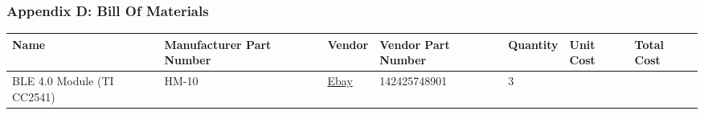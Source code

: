 \documentclass[]{article}
\begin{document}
\hypertarget{appendix-d-bill-of-materials}{%
\subsubsection{Appendix D: Bill Of
Materials}\label{appendix-d-bill-of-materials}}

\begin{longtable}[]{@{}lllllll@{}}
\toprule
\begin{minipage}[b]{0.15\columnwidth}\raggedright
Name\strut
\end{minipage} & \begin{minipage}[b]{0.15\columnwidth}\raggedright
Manufacturer Part Number\strut
\end{minipage} & \begin{minipage}[b]{0.10\columnwidth}\raggedright
Vendor\strut
\end{minipage} & \begin{minipage}[b]{0.17\columnwidth}\raggedright
Vendor Part Number\strut
\end{minipage} & \begin{minipage}[b]{0.11\columnwidth}\raggedright
Quantity\strut
\end{minipage} & \begin{minipage}[b]{0.06\columnwidth}\raggedright
Unit Cost\strut
\end{minipage} & \begin{minipage}[b]{0.07\columnwidth}\raggedright
Total Cost\strut
\end{minipage}\tabularnewline
\midrule
\endhead
\begin{minipage}[t]{0.15\columnwidth}\raggedright
BLE 4.0 Module (TI CC2541)\strut
\end{minipage} & \begin{minipage}[t]{0.15\columnwidth}\raggedright
HM-10\strut
\end{minipage} & \begin{minipage}[t]{0.10\columnwidth}\raggedright
\href{https://www.ebay.com/itm/AT-09-BLE-Bluetooth-4-0-Uart-Transceiver-Module-CC2541-Central-Switching-HM-10/142425748901?ssPageName=STRK\%3AMEBIDX\%3AIT\&_trksid=p2057872.m2749.l2649}{Ebay}\strut
\end{minipage} & \begin{minipage}[t]{0.17\columnwidth}\raggedright
142425748901\strut
\end{minipage} & \begin{minipage}[t]{0.11\columnwidth}\raggedright
3\strut
\end{minipage} & \begin{minipage}[t]{0.06\columnwidth}\raggedright

\end{minipage}
\end{longtable}
\end{document}
